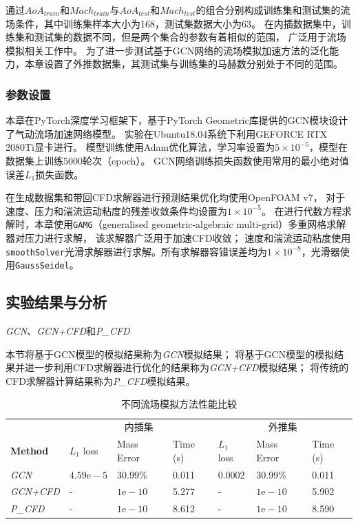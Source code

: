 通过${AoA}_{train}$和${Mach}_{train}$与${AoA}_{test}$和${Mach}_{test}$的组合分别构成训练集和测试集的流场条件，其中训练集样本大小为168，测试集数据大小为63。
在内插数据集中，训练集和测试集的数据不同，但是两个集合的参数有着相似的范围，
广泛用于流场模拟相关工作中\cite{bhatnagar2019prediction,DBLP:conf/kdd/GuoLI16}。
为了进一步测试基于GCN网络的流场模拟加速方法的泛化能力，本章设置了外推数据集，其测试集与训练集的马赫数分别处于不同的范围。



\subsubsection{参数设置}
本章在PyTorch深度学习框架下，基于PyTorch Geometric库提供的GCN模块设计了气动流场加速网络模型。
实验在Ubuntu18.04系统下利用GEFORCE RTX 2080Ti显卡进行。
模型训练使用Adam优化算法，学习率设置为$5\times10^{-5}$，模型在数据集上训练5000轮次（epoch）。
GCN网络训练损失函数使用常用的最小绝对值误差$L_1$损失函数。

在生成数据集和带回CFD求解器进行预测结果优化均使用OpenFOAM v7，
对于速度、压力和湍流运动粘度的残差收敛条件均设置为$1\times10^{-5}$。
在进行代数方程求解时，本章使用\texttt{GAMG}（generalised geometric-algebraic multi-grid）多重网格求解器对压力进行求解，
该求解器广泛用于加速CFD收敛；
速度和湍流运动粘度使用\texttt{smoothSolver}光滑求解器进行求解。所有求解器容错误差均为$1\times10^{-8}$，光滑器使用\texttt{GaussSeidel}。


\subsection{实验结果与分析}

\textit{GCN}、\textit{GCN+CFD}和\textit{P\_CFD}

本节将基于GCN模型的模拟结果称为\textit{GCN}模拟结果；
将基于GCN模型的模拟结果并进一步利用CFD求解器进行优化的结果称为\textit{GCN+CFD}模拟结果；
将传统的CFD求解器计算结果称为\textit{P\_CFD}模拟结果。

\begin{table}[htp]
	\caption{不同流场模拟方法性能比较}
	
	\label{tab:gcn_comp}
	\centering
	
	\begin{tabular}{p{2.2cm}p{1.5cm}p{1.8cm}p{1.4cm}|p{1.5cm}p{1.8cm}p{1.4cm}}
		\toprule
		& \multicolumn{3}{c|}{内插集} & \multicolumn{3}{c}{外推集} \\
		\textbf{Method} &  $L_1$ loss	&	Mass Error &	Time (s)&	$L_1$ loss	&	Mass Error &	Time (s)\\
		\midrule
		
		\textit{GCN}   &	$4.59 \mathrm{e}-5$ &	30.99\% &	0.011&	0.0002	&    30.99\%	& 	0.011\\
		\textit{GCN+CFD}  & 	-	&	$1 \mathrm{e}-10$ &	5.277 &	- &	$1 \mathrm{e}-10$	& 5.902  \\
		\textit{P\_CFD}  & 	-	&	$1 \mathrm{e}-10$ &	8.612 &	- &	$1 \mathrm{e}-10$	& 8.590 \\
		\bottomrule
	\end{tabular}
	
\end{table}

